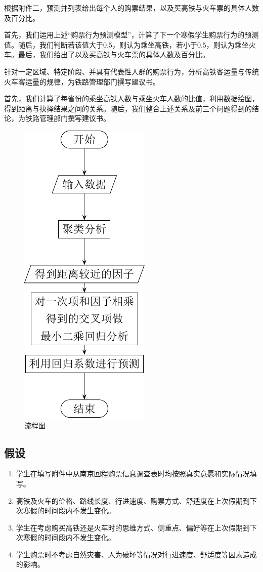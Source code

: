 \documentclass{ctexart}
\newcounter{sub}
\begin{document}
\begin{Exercise}
	根据附件二，预测并列表给出每个人的购票结果，以及买高铁与火车票的具体人数及百分比。
\end{Exercise}

\begin{Answer}
	首先，我们运用上述\enquote{购票行为预测模型}，计算了下一个寒假学生购票行为的预测值。随后，我们判断若该值大于0.5，则认为乘坐高铁，若小于0.5，则认为乘坐火车。最后，我们给出了以及买高铁与火车票的具体人数及百分比。
\end{Answer}

\begin{Exercise}
	针对一定区域、特定阶段、并具有代表性人群的购票行为，分析高铁客运量与传统火车客运量的规律，为铁路管理部门撰写建议书。
\end{Exercise}

\begin{Answer}
	首先，我们计算了每省份的乘坐高铁人数与乘坐火车人数的比值，利用数据绘图，得到距离与抉择结果之间的关系。随后，我们整合上述关系及前三个问题得到的结论，为铁路管理部门撰写建议书。
\end{Answer}

\begin{figure}[htpb]
	\centering
	\includegraphics[height=0.6\linewidth]{dia.pdf}
	\caption{流程图}
	\label{fig:流程图}
\end{figure}

\subsection{假设}%
\label{sub:假设}

\begin{enumerate}
	\item 学生在填写附件中从南京回程购票信息调查表时均按照真实意愿和实际情况填写。
	\item 高铁及火车的价格、路线长度、行进速度、购票方式、舒适度在上次假期到下次寒假的时间段内不发生变化。
	\item 学生在考虑购买高铁还是火车时的思维方式、侧重点、偏好等在上次假期到下次寒假的时间段内不发生变化。
	\item 学生购票时不考虑自然灾害、人为破坏等情况对行进速度、舒适度等因素造成的影响。
\end{enumerate}
\end{document}
